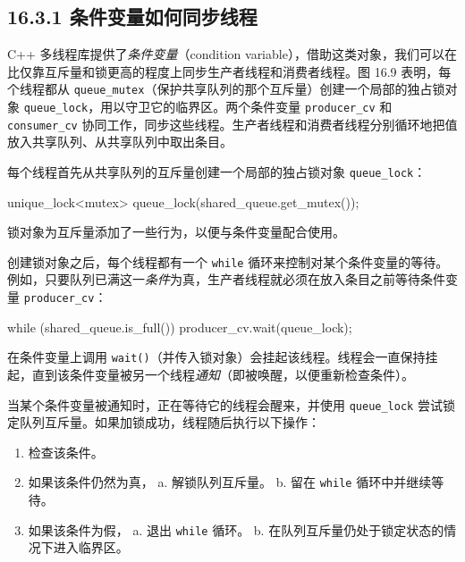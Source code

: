 \subsection{16.3.1 条件变量如何同步线程}

C++ 多线程库提供了\emph{条件变量}（condition variable），借助这类对象，我们可以在比仅靠互斥量和锁更高的程度上同步生产者线程和消费者线程。图 16.9 表明，每个线程都从 \texttt{queue\_\allowbreak{}mutex}（保护共享队列的那个互斥量）创建一个局部的独占锁对象 \texttt{queue\_\allowbreak{}lock}，用以守卫它的临界区。两个条件变量 \texttt{producer\_\allowbreak{}cv} 和 \texttt{consumer\_\allowbreak{}cv} 协同工作，同步这些线程。生产者线程和消费者线程分别循环地把值放入共享队列、从共享队列中取出条目。


每个线程首先从共享队列的互斥量创建一个局部的独占锁对象 \texttt{queue\_\allowbreak{}lock}：

\begin{codebox}
unique_lock<mutex> queue_lock(shared_queue.get_mutex());
\end{codebox}

锁对象为互斥量添加了一些行为，以便与条件变量配合使用。

创建锁对象之后，每个线程都有一个 \texttt{while} 循环来控制对某个条件变量的等待。例如，只要队列已满这一\emph{条件}为真，生产者线程就必须在放入条目之前等待条件变量 \texttt{producer\_\allowbreak{}cv}：

\begin{codebox}
while (shared_queue.is_full()) producer_cv.wait(queue_lock);
\end{codebox}

在条件变量上调用 \texttt{wait()}（并传入锁对象）会挂起该线程。线程会一直保持挂起，直到该条件变量被另一个线程\emph{通知}（即被唤醒，以便重新检查条件）。

当某个条件变量被通知时，正在等待它的线程会醒来，并使用 \texttt{queue\_\allowbreak{}lock} 尝试锁定队列互斥量。如果加锁成功，线程随后执行以下操作：

\begin{enumerate}
\item 检查该条件。
\item 如果该条件仍然为真， a. 解锁队列互斥量。 b. 留在 \texttt{while} 循环中并继续等待。
\item 如果该条件为假， a. 退出 \texttt{while} 循环。 b. 在队列互斥量仍处于锁定状态的情况下进入临界区。
\end{enumerate}

